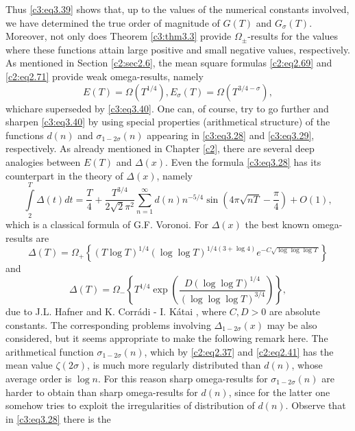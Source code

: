 Thus \eqref{c3:eq3.39} shows that, up to the values of the numerical
constants involved, we have determined the true order of magnitude of
$G(T)$ and $G_\sigma (T)$. Moreover, not only does Theorem
\ref{c3:thm3.3} provide $\Omega_\pm$-results for the values where
these functions attain large positive and small negative values,
respectively. As mentioned in Section \ref{c2:sec2.6}, the mean square
formulas \eqref{c2:eq2.69} and \eqref{c2:eq2.71} provide weak
omega-results, namely
$$
E(T) = \Omega (T^{1/4}), E_\sigma (T) = \Omega (T^{3/4-\sigma}),
$$
which\pageoriginale are superseded by \eqref{c3:eq3.40}. One can, of
course, try to go further and sharpen \eqref{c3:eq3.40} by using
special properties (arithmetical structure) of the functions $d(n)$
and $\sigma_{1- 2 \sigma}(n)$ appearing in \eqref{c3:eq3.28} and
\eqref{c3:eq3.29}, respectively. As already mentioned in Chapter \ref{c2},
there are several deep analogies between $E(T)$ and $\Delta(x)$. Even
the formula \eqref{c3:eq3.28} has its counterpart in the theory of
$\Delta(x)$, namely
$$
\int\limits_2^T \Delta(t) dt = \frac{T}{4} + \frac{T^{3/4}}{2
  \sqrt{2}\pi^2} \sum_{n=1}^\infty d(n) n^{-5/4} \sin \left(4 \pi \sqrt{n
  T}- \frac{\pi}{4}\right) + O(1),
$$
which is a classical formula of G.F. Voronoi. For $\Delta(x)$ the best
known omega-results are
\begin{equation}
  \Delta(T) = \Omega_+ \left\{(T \log T)^{1/4} (\log \log T)^{1/4(3+
    \log 4)}e^{- C\sqrt{\log \log \log T}} \right\}\label{c3:eq3.41}
\end{equation}
and 
\begin{equation}
  \Delta (T) = \Omega_- \left\{T^{1/4} \exp \left(\frac{D(\log \log
    T)^{1/4}}{(\log \log \log T)^{3/4}} \right) \right\}, \label{c3:eq3.42}
\end{equation}
due to J.L. Hafner \cite{Hafner1} and K. Corr\'adi - I. K\'atai \cite{Corradi and Katai1},
where $C, D > 0$ are absolute constants. The corresponding problems
involving $\Delta_{1- 2 \sigma}(x)$ may be also considered, but it
seems appropriate to make the following remark here. The arithmetical
function $\sigma_{1- 2 \sigma}(n)$, which by \eqref{c2:eq2.37} and
\eqref{c2:eq2.41} has the mean value $\zeta(2 \sigma)$, is much more
regularly distributed than $d(n)$, whose average order is $\log
n$. For this reason sharp omega-results for $\sigma_{1- 2 \sigma}(n)$
are harder to obtain than sharp omega-results for $d(n)$,  since for
the latter one somehow tries to exploit the irregularities of
distribution of $d(n)$. Observe that in \eqref{c3:eq3.28} there is the
